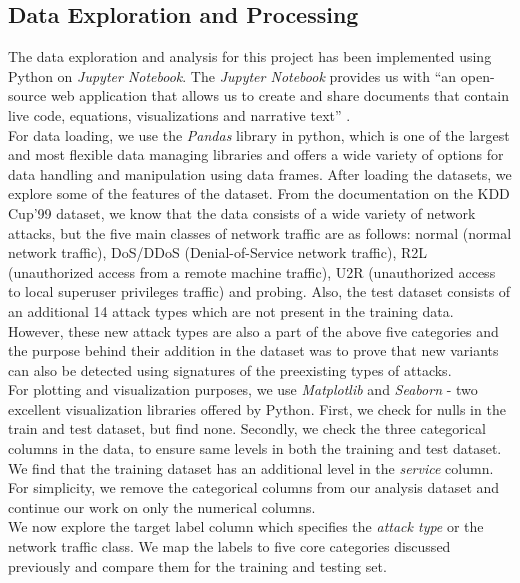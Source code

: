 \subsection{Data Exploration and Processing}
The data exploration and analysis for this project has been implemented using Python on {\em Jupyter Notebook}. The {\em Jupyter Notebook} provides us with ``an open-source web application that allows us to create and share documents that contain live code, equations, visualizations and narrative text'' \cite{jup08}.\\
For data loading, we use the {\em Pandas} library in python, which is one of the largest and most flexible data managing libraries and offers a wide variety of options for data handling and manipulation using data frames. After loading the datasets, we explore some of the features of the dataset. From the documentation on the KDD Cup'99 dataset, we know that the data consists of a wide variety of network attacks, but the five main classes of network traffic are as follows: normal (normal network traffic), DoS/DDoS (Denial-of-Service network traffic), R2L (unauthorized access from a remote machine traffic), U2R (unauthorized access to local superuser privileges traffic) and probing. Also, the test dataset consists of an additional 14 attack types which are not present in the training data. However, these new attack types are also a part of the above five categories and the purpose behind their addition in the dataset was to prove that new variants can also be detected using signatures of the preexisting types of attacks.\\
For plotting and visualization purposes, we use {\em Matplotlib} and {\em Seaborn} - two excellent visualization libraries offered by Python. First, we check for nulls in the train and test dataset, but find none. Secondly, we check the three categorical columns in the data, to ensure same levels in both the training and test dataset. We find that the training dataset has an additional level in the {\em service} column. For simplicity, we remove the categorical columns from our analysis dataset and continue our work on only the numerical columns.\\
We now explore the target label column which specifies the {\em attack type} or the network traffic class. We map the labels to five core categories discussed previously and compare them for the training and testing set.
